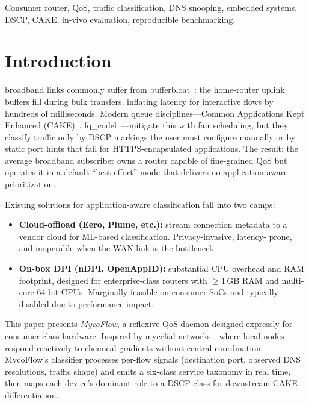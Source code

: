 \documentclass[journal,onecolumn]{IEEEtran}
\begin{document}
\begin{IEEEkeywords}
Consumer router, QoS, traffic classification, DNS snooping, embedded systems,
DSCP, CAKE, in-vivo evaluation, reproducible benchmarking.
\end{IEEEkeywords}

\IEEEpeerreviewmaketitle

\section{Introduction}
\label{sec:intro}

 broadband links commonly suffer from
bufferbloat~\cite{bufferbloat-2011}: the home-router uplink buffers fill
during bulk transfers, inflating latency for interactive flows by hundreds
of milliseconds. Modern queue disciplines—Common Applications Kept Enhanced
(CAKE)~\cite{cake-2018}, fq\_codel~\cite{fqcodel-2018}—mitigate this with
fair scheduling, but they classify traffic only by DSCP markings the user
must configure manually or by static port hints that fail for HTTPS-encapsulated
applications. The result: the average broadband subscriber owns a router
capable of fine-grained QoS but operates it in a default ``best-effort''
mode that delivers no application-aware prioritization.

Existing solutions for application-aware classification fall into two camps:
\begin{itemize}
\item \textbf{Cloud-offload (Eero, Plume, etc.):} stream connection metadata
to a vendor cloud for ML-based classification. Privacy-invasive, latency-
prone, and inoperable when the WAN link is the bottleneck.
\item \textbf{On-box DPI (nDPI, OpenAppID):} substantial CPU overhead and
RAM footprint, designed for enterprise-class routers with $\geq$1\,GB RAM
and multi-core 64-bit CPUs. Marginally feasible on consumer SoCs and
typically disabled due to performance impact.
\end{itemize}

This paper presents \emph{MycoFlow}, a reflexive QoS daemon designed
expressly for consumer-class hardware. Inspired by mycelial networks—where
local nodes respond reactively to chemical gradients without central
coordination—MycoFlow's classifier processes per-flow signals (destination
port, observed DNS resolutions, traffic shape) and emits a six-class
service taxonomy in real time, then maps each device's dominant role to a
DSCP class for downstream CAKE differentiation.
\end{document}
